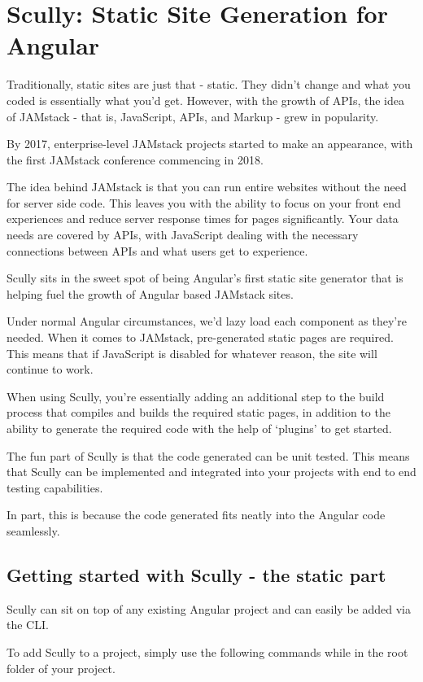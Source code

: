 \chapter{ Scully: Static Site Generation for Angular }
Traditionally, static sites are just that - static. They didn't change and what you coded is essentially what you'd get. However, with the growth of APIs, the idea of JAMstack - that is, JavaScript, APIs, and Markup - grew in popularity.

By 2017, enterprise-level JAMstack projects started to make an appearance, with the first JAMstack conference commencing in 2018.

The idea behind JAMstack is that you can run entire websites without the need for server side code. This leaves you with the ability to focus on your front end experiences and reduce server response times for pages significantly. Your data needs are covered by APIs, with JavaScript dealing with the necessary connections between APIs and what users get to experience.

Scully sits in the sweet spot of being Angular's first static site generator that is helping fuel the growth of Angular based JAMstack sites. 

Under normal Angular circumstances, we'd lazy load each component as they're needed. When it comes to JAMstack, pre-generated static pages are required. This means that if JavaScript is disabled for whatever reason, the site will continue to work.

When using Scully, you're essentially adding an additional step to the build process that compiles and builds the required static pages, in addition to the ability to generate the required code with the help of ‘plugins' to get started.

The fun part of Scully is that the code generated can be unit tested. This means that Scully can be implemented and integrated into your projects with end to end testing capabilities.

In part, this is because the code generated fits neatly into the Angular code seamlessly. 

\section{Getting started with Scully - the static part}
Scully can sit on top of any existing Angular project and can easily be added via the CLI.

To add Scully to a project, simply use the following commands while in the root folder of your project.


